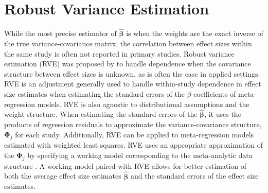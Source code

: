 




\section{Robust Variance Estimation}

While the most precise estimator of $\bm{\hat{\beta}}$ is when the weights are the exact inverse of the true variance-covariance matrix, the correlation between effect sizes within the same study is often not reported in primary studies. Robust variance estimation (RVE) was proposed by \textcite{hedges2010} to handle dependence when the covariance structure between effect sizes is unknown, as is often the case in applied settings. RVE is an adjustment generally used to handle within-study dependence in effect size estimates when estimating the standard errors of the $\beta$ coefficients of meta-regression models. RVE is also agnostic to distributional assumptions and the weight structure. When estimating the standard errors of the $\bm{\hat{\beta}}$, it uses the products of regression residuals to approximate the variance-covariance structure, $\mathbf{\Phi}_j$ for each study. Additionally, RVE can be applied to meta-regression models estimated with weighted least squares. RVE uses an appropriate approximation of the $\mathbf{\Phi}_j$ by specifying a working model corresponding to the meta-analytic data structure \autocite{pustejovsky2022}. A working model paired with RVE allows for better estimation of both the average effect size estimates $\bm{\hat{\beta}}$ and the standard errors of the effect size estimates. 

